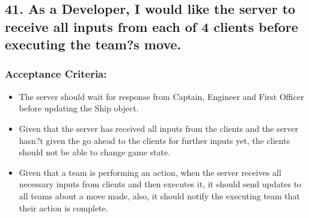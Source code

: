 \subsection*{41. As a Developer, I would like the server to receive all inputs from each of 4 clients before executing the team?s move.}


\subsubsection*{Acceptance Criteria:}

\begin{itemize}
\item The server should wait for response from Captain, Engineer and First Officer before updating the Ship object.
\item Given that the server has received all inputs from the clients and the server hasn?t given the go ahead to the clients for further inputs yet, the clients should not be able to change game state.
\item Given that a team is performing an action, when the server receives all necessary inputs from clients and then executes it, it should send updates to all teams about a move made, also, it should notify the executing team that their action is complete.
\end{itemize}

